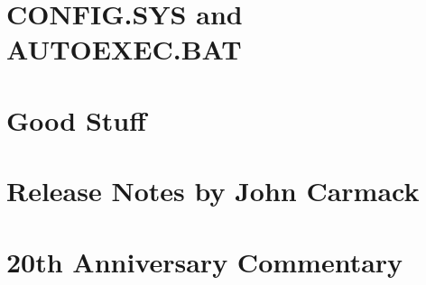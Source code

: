 \documentclass[8pt]{book}
\begin{document}
    \chapter{CONFIG.SYS and AUTOEXEC.BAT}
         
    \chapter{Good Stuff}
          
    \chapter{Release Notes by John Carmack}
        
    \chapter{20th Anniversary Commentary}
        

    
    \cleartoleftpage %
    
    \blankpage
    \blankpage
\end{document}
